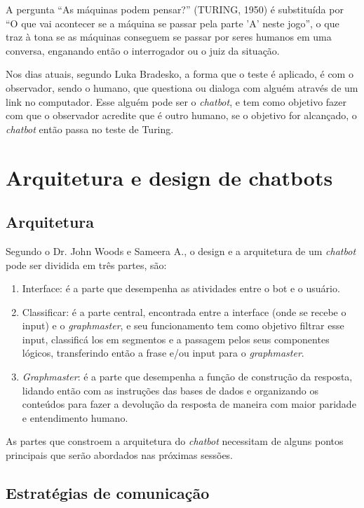 \documentclass[
	12pt,				%
	oneside,
	a4paper,			%
	english,			%
	french,				%
	spanish,			%
	brazil				%
	]{abntex2}
\begin{document}
A pergunta “As máquinas podem pensar?” (TURING, 1950) é substituída por “O que vai acontecer se a máquina se passar pela parte 'A' neste jogo”, o que traz à tona se as máquinas conseguem se passar por seres humanos em uma conversa, enganando então o interrogador ou o juiz da situação.\supercite{Turing}

Nos dias atuais, segundo Luka Bradesko\supercite{LukaBradesko}, a forma que o teste é aplicado, é com o observador, sendo o humano, que questiona ou dialoga com alguém através de um link no computador. Esse alguém pode ser o \emph{chatbot}, e tem como objetivo fazer com que o observador acredite que é outro humano, se o objetivo for alcançado, o \emph{chatbot} então passa no teste de Turing.

\chapter{Arquitetura e design de chatbots}

\section{Arquitetura}
Segundo o Dr. John Woods e Sameera A.\supercite{Abdul-Kader2015}, o design e a arquitetura de um \emph{chatbot} pode ser dividida em três partes, são:

\begin{enumerate}
	\item Interface: é a parte que desempenha as atividades entre o bot e o usuário.
	\item Classificar: é a parte central, encontrada entre a interface (onde se recebe o input) e o \emph{graphmaster}, e seu funcionamento tem como objetivo filtrar esse input, classificá los em segmentos e a passagem pelos seus componentes lógicos, transferindo então a frase e/ou input para o \emph{graphmaster}.
	\item \emph{Graphmaster}: é a parte que desempenha a função de construção da resposta, lidando então com as instruções das bases de dados e organizando os conteúdos para fazer a devolução da resposta de maneira com maior paridade e entendimento humano.
\end{enumerate}

As partes que constroem a arquitetura do \emph{chatbot} necessitam de alguns pontos principais que serão abordados nas próximas sessões.

\section{Estratégias de comunicação}
\end{document}
